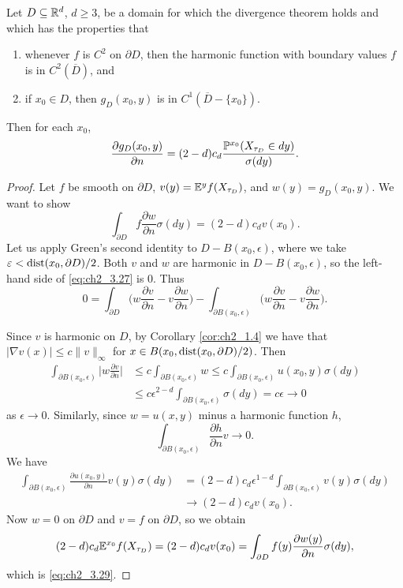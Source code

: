 \begin{proposition}\label{prop:ch2_3.11}
Let $D \subseteq \R^d$, $d \geq 3$, be a domain for which the divergence theorem holds and which has the properties that
\begin{enumerate}
    \item whenever $f$ is $C^2$ on $\partial D$, then the harmonic function with boundary values $f$ is in $C^2(\overline{D})$, and
    \item if $x_0 \in D$, then $g_D(x_0,y)$ is in $C^1(\overline{D} - \{x_0\})$.
\end{enumerate}
Then for each $x_0$,
\[
    \frac{\partial g_D(x_0,y)}{\partial n} = (2-d)c_d\frac{\P^{x_0}(X_{\tau_D} \in dy)}{\sigma(dy)}.
\]
\end{proposition}

\begin{proof}
Let $f$ be smooth on $\partial D$, $v(y) = \E^yf(X_{\tau_D})$, and $w(y) = g_D(x_0,y)$. We want to show
\begin{equation}\label{eq:ch2_3.29}
    \int_{\partial D} f\frac{\partial w}{\partial n}\sigma(dy) = (2-d)c_dv(x_0).
\end{equation}
Let us apply Green's second identity to $D - B(x_0,\epsilon)$, where we take $\epsilon < \dist(x_0,\partial D)/2$. Both $v$ and $w$ are harmonic in $D - B(x_0,\epsilon)$, so the left-hand side of \eqref{eq:ch2_3.27} is $0$. Thus
\[
    0 = \int_{\partial D} \Big(w\frac{\partial v}{\partial n} - v\frac{\partial w}{\partial n}\Big) - \int_{\partial B(x_0,\epsilon)} \Big(w\frac{\partial v}{\partial n} - v\frac{\partial w}{\partial n}\Big).
\]

Since $v$ is harmonic on $D$, by Corollary \ref{cor:ch2_1.4} we have that $|\nabla v(x)| \leq c\|v\|_\infty$ for $x \in B(x_0,\dist(x_0,\partial D)/2)$. Then
\begin{align*}
    \int_{\partial B(x_0,\epsilon)} \Big|w\frac{\partial v}{\partial n}\Big| &\leq c \int_{\partial B(x_0,\epsilon)} w \leq c \int_{\partial B(x_0,\epsilon)} u(x_0,y)\sigma(dy) \\
    &\leq c\epsilon^{2-d} \int_{\partial B(x_0,\epsilon)} \sigma(dy) = c\epsilon \to 0
\end{align*}
as $\epsilon \to 0$. Similarly, since $w = u(x,y)$ minus a harmonic function $h$,
\[
    \int_{\partial B(x_0,\epsilon)} \frac{\partial h}{\partial n}v \to 0.
\]
We have
\mpagebreak
\begin{align*}
    \int_{\partial B(x_0,\epsilon)} \frac{\partial u(x_0,y)}{\partial n}v(y)\sigma(dy) &= (2-d)c_d\epsilon^{1-d} \int_{\partial B(x_0,\epsilon)} v(y)\sigma(dy) \\
    &\to (2-d)c_dv(x_0).
\end{align*}
Now $w = 0$ on $\partial D$ and $v = f$ on $\partial D$, so we obtain
\[
    (2-d)c_d\E^{x_0}f(X_{\tau_D}) = (2-d)c_dv(x_0) = \int_{\partial D} f(y)\frac{\partial w(y)}{\partial n}\sigma(dy),
\]
which is \eqref{eq:ch2_3.29}.
\end{proof}

